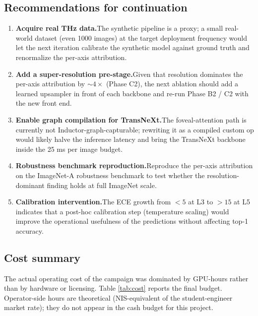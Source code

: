 \subsection{Recommendations for continuation}
\begin{enumerate}
  \item \textbf{Acquire real THz data.}\quad The synthetic pipeline is
        a proxy; a small real-world dataset (even 1000 images) at the
        target deployment frequency would let the next iteration
        calibrate the synthetic model against ground truth and
        renormalize the per-axis attribution.
  \item \textbf{Add a super-resolution pre-stage.}\quad Given that
        resolution dominates the per-axis attribution by $\sim 4 \times$
        (Phase C2), the next ablation should add a learned upsampler
        in front of each backbone and re-run Phase B2 / C2 with the
        new front end.
  \item \textbf{Enable graph compilation for TransNeXt.}\quad The
        foveal-attention path is currently not
        Inductor-graph-capturable; rewriting it as a compiled custom
        op would likely halve the inference latency and bring the
        TransNeXt backbone inside the 25 ms per image budget.
  \item \textbf{Robustness benchmark reproduction.}\quad Reproduce
        the per-axis attribution on the ImageNet-A robustness
        benchmark \cite{hendrycks2021naturaladv} to test whether the
        resolution-dominant finding holds at full ImageNet scale.
  \item \textbf{Calibration intervention.}\quad The ECE growth from
        $< 5$ \Mpp{} at L3 to $> 15$ \Mpp{} at L5 indicates that a
        post-hoc calibration step (temperature scaling) would
        improve the operational usefulness of the predictions
        without affecting top-1 accuracy.
\end{enumerate}

\subsection{Cost summary}
The actual operating cost of the campaign was dominated by GPU-hours
rather than by hardware or licensing. Table \ref{tab:cost} reports the
final budget. Operator-side hours are theoretical (NIS-equivalent of the
student-engineer market rate); they do not appear in the cash budget for
this project.

